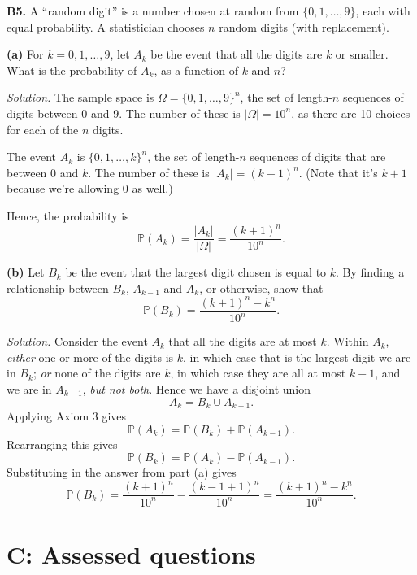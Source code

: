 \documentclass[
  a4paper,
]{book}
\theoremstyle{definition}
\theoremstyle{definition}
\theoremstyle{definition}
\theoremstyle{definition}
\theoremstyle{remark}
\begin{document}
\textbf{B5.} A ``random digit'' is a number chosen at random from \(\{0, 1, \dots, 9\}\), each with equal probability. A statistician chooses \(n\) random digits (with replacement).

\textbf{(a)} For \(k = 0, 1, \dots, 9\), let \(A_k\) be the event that all the digits are \(k\) or smaller. What is the probability of \(A_k\), as a function of \(k\) and \(n\)?

\begin{myanswers}
\emph{Solution.}
The sample space is \(\Omega = \{0,1,\dots,9\}^n\), the set of length-\(n\) sequences of digits between \(0\) and \(9\). The number of these is \(|\Omega| = 10^n\), as there are 10 choices for each of the \(n\) digits.

The event \(A_k\) is \(\{0,1,\dots,k\}^n\), the set of length-\(n\) sequences of digits that are between \(0\) and \(k\). The number of these is \(|A_k| = (k+1)^n\). (Note that it's \(k+1\) because we're allowing 0 as well.)

Hence, the probability is
\[ \mathbb P(A_k) = \frac{|A_k|}{|\Omega|} = \frac{(k+1)^n}{10^n} . \]

\end{myanswers}

\textbf{(b)} Let \(B_k\) be the event that the largest digit chosen is equal to \(k\). By finding a relationship between \(B_k\), \(A_{k-1}\) and \(A_k\), or otherwise, show that
\[ \mathbb P(B_k) = \frac{(k+1)^n - k^n}{10^n} . \]

\begin{myanswers}
\emph{Solution.}
Consider the event \(A_k\) that all the digits are at most \(k\). Within \(A_k\), \emph{either} one or more of the digits is \(k\), in which case that is the largest digit we are in \(B_k\); \emph{or} none of the digits are \(k\), in which case they are all at most \(k-1\), and we are in \(A_{k-1}\), \emph{but not both}. Hence we have a disjoint union
\[ A_k = B_k \cup A_{k-1} . \]
Applying Axiom 3 gives
\[ \mathbb P(A_k) = \mathbb P(B_k) + \mathbb P(A_{k-1}) . \]
Rearranging this gives
\[ \mathbb P(B_k) = \mathbb P(A_k) - \mathbb P(A_{k-1}) . \]
Substituting in the answer from part (a) gives
\[\mathbb P(B_k) = \frac{(k+1)^n}{10^n} - \frac{(k-1+1)^n}{10^n} = \frac{(k+1)^n - k^n}{10^n} . \]

\end{myanswers}

\hypertarget{P2-assessed}{%
\section*{C: Assessed questions}\label{P2-assessed}}
\end{document}
